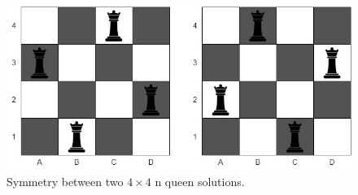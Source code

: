 

\begin{figure}[H]
	\centering
	\includegraphics[scale=0.4]{graphics/symmetry.jpg}
	\caption{Symmetry between two $4\times 4$ n queen solutions.}
	\label{fig:symmetry}
	
\end{figure}